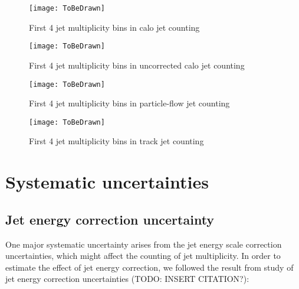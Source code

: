 \documentclass{cmspaper}
\begin{document}
\begin{figure}[hbtp]
   \begin{center} 
  \texttt{[image: ToBeDrawn]}
   \caption{First 4 jet multiplicity bins in calo jet counting}
   \label{Figure_CaloJetFit}
   \end{center}
\end{figure}

\begin{figure}[hbtp]
   \begin{center} 
  \texttt{[image: ToBeDrawn]}
   \caption{First 4 jet multiplicity bins in uncorrected calo jet counting}
   \label{Figure_UncorrectedCaloJetFit}
   \end{center}
\end{figure}

\begin{figure}[hbtp]
   \begin{center}
  \texttt{[image: ToBeDrawn]}
   \caption{First 4 jet multiplicity bins in particle-flow jet counting}
   \label{Figure_PFJetFit}
   \end{center}
\end{figure}

\begin{figure}[hbtp]
   \begin{center} 
  \texttt{[image: ToBeDrawn]}
   \caption{First 4 jet multiplicity bins in track jet counting}
   \label{Figure_TrackJetFit}
   \end{center}
\end{figure}

\section{Systematic uncertainties}


\subsection{Jet energy correction uncertainty}

One major systematic uncertainty arises from the jet energy scale
correction uncertainties, which might affect the counting of jet
multiplicity.  In order to estimate the effect of jet energy
correction, we followed the result from study of jet energy correction
uncertainties (TODO: INSERT CITATION?):
\end{document}
